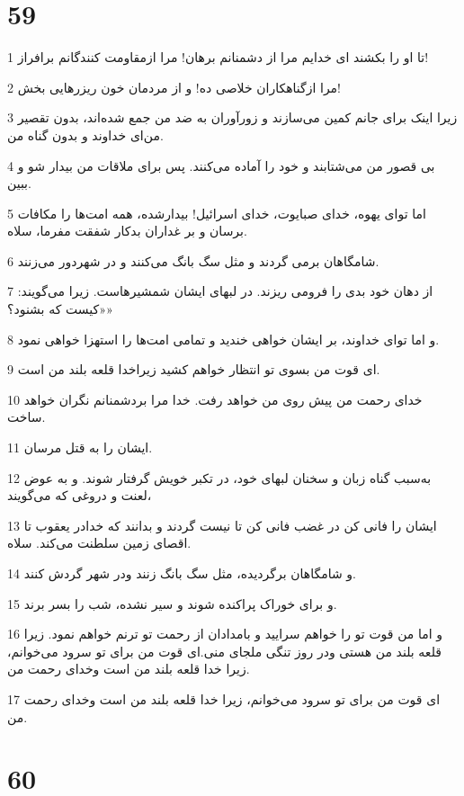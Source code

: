\chapter{59}

\par 1 تا او را بکشند ای خدایم مرا از دشمنانم برهان! مرا ازمقاومت کنندگانم برافراز!
\par 2 مرا ازگناهکاران خلاصی ده! و از مردمان خون ریزرهایی بخش!
\par 3 زیرا اینک برای جانم کمین می‌سازند و زورآوران به ضد من جمع شده‌اند، بدون تقصیر من‌ای خداوند و بدون گناه من.
\par 4 بی قصور من می‌شتابند و خود را آماده می‌کنند. پس برای ملاقات من بیدار شو و ببین.
\par 5 اما تو‌ای یهوه، خدای صبایوت، خدای اسرائیل! بیدارشده، همه امت‌ها را مکافات برسان و بر غداران بدکار شفقت مفرما، سلاه.
\par 6 شامگاهان برمی گردند و مثل سگ بانگ می‌کنند و در شهردور می‌زنند.
\par 7 از دهان خود بدی را فرومی ریزند. در لبهای ایشان شمشیرهاست. زیرا می‌گویند: «کیست که بشنود؟»
\par 8 و اما تو‌ای خداوند، بر ایشان خواهی خندید و تمامی امت‌ها را استهزا خواهی نمود.
\par 9 ‌ای قوت من بسوی تو انتظار خواهم کشید زیراخدا قلعه بلند من است.
\par 10 خدای رحمت من پیش روی من خواهد رفت. خدا مرا بردشمنانم نگران خواهد ساخت. 
\par 11 ایشان را به قتل مرسان.
\par 12 به‌سبب گناه زبان و سخنان لبهای خود، در تکبر خویش گرفتار شوند. و به عوض لعنت و دروغی که می‌گویند،
\par 13 ایشان را فانی کن در غضب فانی کن تا نیست گردند و بدانند که خدادر یعقوب تا اقصای زمین سلطنت می‌کند. سلاه.
\par 14 و شامگاهان برگردیده، مثل سگ بانگ زنند ودر شهر گردش کنند.
\par 15 و برای خوراک پراکنده شوند و سیر نشده، شب را بسر برند.
\par 16 و اما من قوت تو را خواهم سرایید و بامدادان از رحمت تو ترنم خواهم نمود. زیرا قلعه بلند من هستی ودر روز تنگی ملجای منی.‌ای قوت من برای تو سرود می‌خوانم، زیرا خدا قلعه بلند من است وخدای رحمت من.
\par 17 ‌ای قوت من برای تو سرود می‌خوانم، زیرا خدا قلعه بلند من است وخدای رحمت من.
 
\chapter{60}

